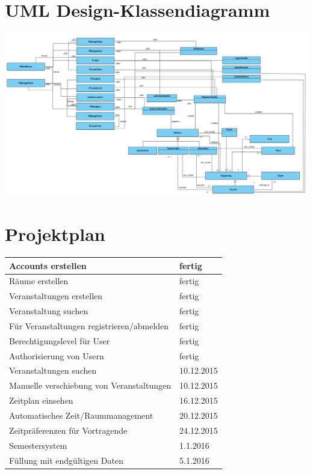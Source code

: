 \documentclass[a4paper,12pt]{article}
\begin{document}
\section*{UML Design-Klassendiagramm}
\begin{center}
	\includegraphics[scale=.5,angle=90]{DesignClassDiagram.png}
\end{center}
\newpage
\section*{Projektplan}
\begin{tabular}{|l|l|}
	\hline
	Accounts erstellen & fertig \\ \hline
	Räume erstellen & fertig \\ \hline
	Veranstaltungen erstellen & fertig \\ \hline
	Veranstaltung suchen & fertig \\ \hline
	Für Veranstaltungen registrieren/abmelden & fertig \\ \hline
	Berechtigungslevel für User & fertig \\ \hline
	Authorisierung von Usern & fertig \\ \hline
	Veranstaltungen suchen & 10.12.2015 \\ \hline
	Manuelle verschiebung von Veranstaltungen & 10.12.2015 \\ \hline
	Zeitplan einsehen & 16.12.2015 \\ \hline
	Automatisches Zeit/Raummanagement & 20.12.2015 \\ \hline
	Zeitpräferenzen für Vortragende & 24.12.2015 \\ \hline
	Semestersystem & 1.1.2016\\ \hline
	Füllung mit endgültigen Daten & 5.1.2016\\ \hline
\end{tabular}
\end{document}
